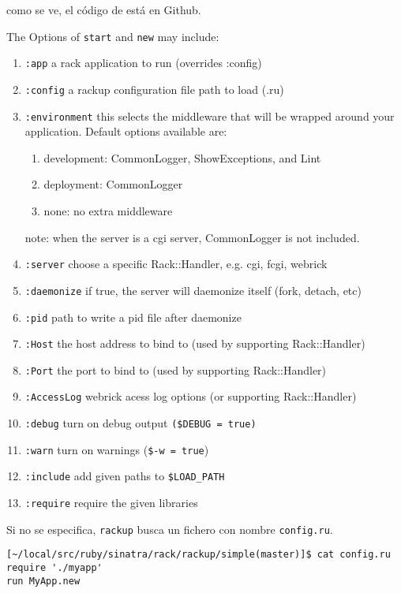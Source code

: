 como se ve, el código 
de
\rackserversrc{}
está en
Github.

The Options of \verb|start| and \verb|new|  may include:
\begin{enumerate}
\item \verb|:app|
    a rack application to run (overrides :config)
\item \verb|:config|
    a rackup configuration file path to load (.ru)
\item \verb|:environment|
    this selects the middleware that will be wrapped around
    your application. Default options available are:
    \begin{enumerate}
      \item development: CommonLogger, ShowExceptions, and Lint
      \item deployment: CommonLogger
      \item none: no extra middleware
    \end{enumerate}
    note: when the server is a cgi server, CommonLogger is not included.
\item \verb|:server|
    choose a specific Rack::Handler, e.g. cgi, fcgi, webrick
\item \verb|:daemonize|
    if true, the server will daemonize itself (fork, detach, etc)
\item \verb|:pid|
    path to write a pid file after daemonize
\item \verb|:Host|
    the host address to bind to (used by supporting Rack::Handler)
\item \verb|:Port|
    the port to bind to (used by supporting Rack::Handler)
\item \verb|:AccessLog|
    webrick acess log options (or supporting Rack::Handler)
\item \verb|:debug|
    turn on debug output \verb|($DEBUG = true)|
\item \verb|:warn|
    turn on warnings (\verb|$-w = true|)
\item \verb|:include|
    add given paths to \verb|$LOAD_PATH|
\item \verb|:require|
    require the given libraries
\end{enumerate}


Si no se especifica, \verb|rackup| busca un fichero con nombre \verb|config.ru|.
\begin{verbatim}
[~/local/src/ruby/sinatra/rack/rackup/simple(master)]$ cat config.ru 
require './myapp'
run MyApp.new
\end{verbatim}

